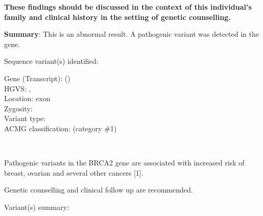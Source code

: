 \documentclass[10pt]{article}
\newcommand{\data}[1]{}
\newenvironment{dataiter}[1]{}{}
\begin{document}
\vspace{-1em}
\hfill \parbox{19cm}{
  {\bf These findings should be discussed in the context of this individual's family and clinical history in the setting of genetic counselling.}

  \vspace{1em}
  {\bf Summary}: This is an abnormal result. A pathogenic variant was detected in the gene.

  \vspace{1em}
  Sequence variant(s) identified:\\
}
\begin{dataiter}{variants}
\vspace{-1em}
\hfill \parbox{19cm}{
  Gene (Transcript): \data{gene_symbol} (\data{transcript_id}) \\
  \vspace{1em}
  HGVS: \data{hgvsc}, \data{hgvsp} \\
  Location: exon \data{exon} \\
  Zygosity: \data{zygosity} \\
  Variant type: \data{type} \\
  ACMG classification: \data{interpretation} (category \#1)
}
\end{dataiter}


\\

\vspace{-1em}
\hfill \parbox{19cm}{
  Pathogenic variants in the BRCA2 gene are associated with increased risk of breast, ovarian and several other cancers [1].

  \vspace{1em}
  Genetic counselling and clinical follow up are recommended.

  \vspace{1em}
  Variant(s) summary:
  \vspace{1em}
  
  \data{plugin:long_blurb}
}
\end{document}
